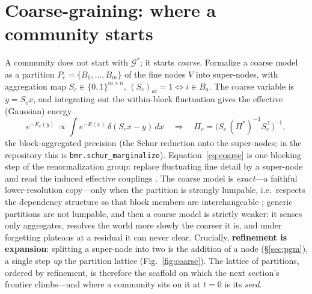 \documentclass[11pt]{article}
\theoremstyle{definition}
\theoremstyle{plain}
\begin{document}
\section{Coarse-graining: where a community starts}
\label{sec:coarse}

A community does not start with $\mathcal G^\ast$; it starts \emph{coarse}. Formalize a coarse model
as a partition $P_c=\{B_1,\dots,B_m\}$ of the fine nodes $V$ into super-nodes, with aggregation map
$S_c\in\{0,1\}^{m\times n}$, $(S_c)_{ai}=1\Leftrightarrow i\in B_a$. The coarse variable is
$y=S_c x$, and integrating out the within-block fluctuation gives the effective (Gaussian) energy
\begin{equation}
e^{-E_c(y)}\ \propto\!\!\int\!\! e^{-E(x)}\,\delta(S_c x-y)\,dx
\quad\Longrightarrow\quad
\Pi_c=\big(S_c\,(\Pi^\ast)^{-1}S_c^\top\big)^{-1},
\label{eq:coarse}
\end{equation}
the block-aggregated precision (the Schur reduction onto the super-nodes; in the repository this is
\texttt{bmr.schur\_marginalize}). Equation~\eqref{eq:coarse} is one blocking step of the
renormalization group: replace fluctuating fine detail by a super-node and read the induced
effective couplings \citep{kadanoff1966,wilson1975,jonalasinio1975}. The coarse model is
\emph{exact}---a faithful lower-resolution copy---only when the partition is strongly lumpable, i.e.\
respects the dependency structure so that block members are interchangeable \citep{kemenysnell1976};
generic partitions are not lumpable, and then a coarse model is strictly weaker: it senses only
aggregates, resolves the world more slowly the coarser it is, and under forgetting plateaus at a
residual it can never clear. Crucially, \textbf{refinement is expansion}: splitting a super-node into
two is the addition of a node (\S\ref{sec:pgm}), a single step \emph{up} the partition lattice
(Fig.~\ref{fig:coarse}). The lattice of partitions, ordered by refinement, is therefore the scaffold
on which the next section's frontier climbs---and where a community sits on it at $t=0$ is its
\emph{seed}.
\end{document}
